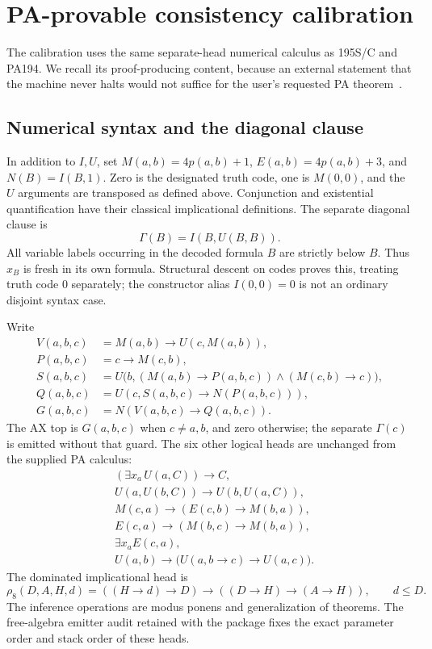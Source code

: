 \documentclass[11pt]{article}
\begin{document}
\section{PA-provable consistency calibration}\label{sec:calibration}

The calibration uses the same separate-head numerical calculus as 195S/C
and PA194. We recall its proof-producing content, because an external
statement that the machine never halts would not suffice for the user's
requested PA theorem~\cite{pa194,pa195c}.

\subsection{Numerical syntax and the diagonal clause}

In addition to $I,U$, set $M(a,b)=4p(a,b)+1$,
$E(a,b)=4p(a,b)+3$, and $N(B)=I(B,1)$. Zero is the designated truth code,
one is $M(0,0)$, and the $U$ arguments are transposed as defined above.
Conjunction and existential quantification have their classical
implicational definitions. The separate diagonal clause is
\[
\Gamma(B)=I(B,U(B,B)).
\]
All variable labels occurring in the decoded formula $B$ are strictly
below $B$. Thus $x_B$ is fresh in its own formula. Structural descent on
codes proves this, treating truth code 0 separately; the constructor
alias $I(0,0)=0$ is not an ordinary disjoint syntax case.

Write
\begin{align*}
V(a,b,c)&=M(a,b)\to U(c,M(a,b)),\\
P(a,b,c)&=c\to M(c,b),\\
S(a,b,c)&=U\bigl(b,(M(a,b)\to P(a,b,c))\wedge(M(c,b)\to c)\bigr),\\
Q(a,b,c)&=U(c,S(a,b,c)\to N(P(a,b,c))),\\
G(a,b,c)&=N(V(a,b,c)\to Q(a,b,c)).
\end{align*}
The AX top is $G(a,b,c)$ when $c\ne a,b$, and zero otherwise; the
separate $\Gamma(c)$ is emitted without that guard.
The six other logical heads are unchanged from the supplied PA calculus:
\begin{align*}
 &(\exists x_a\,U(a,C))\to C,\\
 &U(a,U(b,C))\to U(b,U(a,C)),\\
 &M(c,a)\to(E(c,b)\to M(b,a)),\\
 &E(c,a)\to(M(b,c)\to M(b,a)),\\
 &\exists x_a E(c,a),\\
 &U(a,b)\to\bigl(U(a,b\to c)\to U(a,c)\bigr).
\end{align*}
The dominated implicational head is
\[
 \rho_8(D,A,H,d)=((H\to d)\to D)\to((D\to H)\to(A\to H)),\qquad d\le D.
\]
The inference operations are modus ponens and generalization of
theorems. The free-algebra emitter audit retained with the package fixes
the exact parameter order and stack order of these heads.
\end{document}
